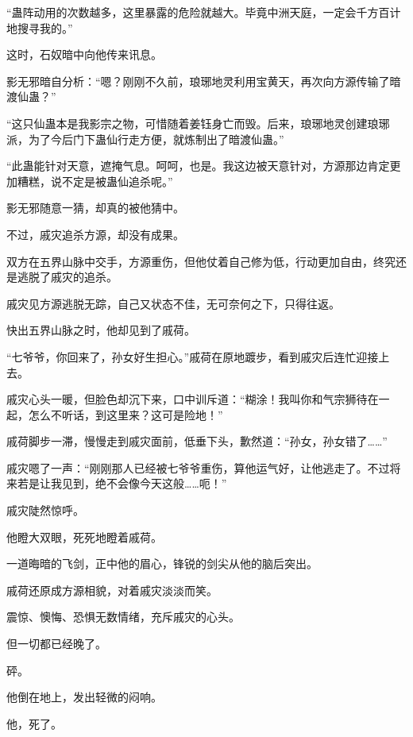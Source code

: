\begin{this_body}
“蛊阵动用的次数越多，这里暴露的危险就越大。毕竟中洲天庭，一定会千方百计地搜寻我的。”

这时，石奴暗中向他传来讯息。

影无邪暗自分析：“嗯？刚刚不久前，琅琊地灵利用宝黄天，再次向方源传输了暗渡仙蛊？”

“这只仙蛊本是我影宗之物，可惜随着姜钰身亡而毁。后来，琅琊地灵创建琅琊派，为了今后门下蛊仙行走方便，就炼制出了暗渡仙蛊。”

“此蛊能针对天意，遮掩气息。呵呵，也是。我这边被天意针对，方源那边肯定更加糟糕，说不定是被蛊仙追杀呢。”

影无邪随意一猜，却真的被他猜中。

不过，戚灾追杀方源，却没有成果。

双方在五界山脉中交手，方源重伤，但他仗着自己修为低，行动更加自由，终究还是逃脱了戚灾的追杀。

戚灾见方源逃脱无踪，自己又状态不佳，无可奈何之下，只得往返。

快出五界山脉之时，他却见到了戚荷。

“七爷爷，你回来了，孙女好生担心。”戚荷在原地踱步，看到戚灾后连忙迎接上去。

戚灾心头一暖，但脸色却沉下来，口中训斥道：“糊涂！我叫你和气宗狮待在一起，怎么不听话，到这里来？这可是险地！”

戚荷脚步一滞，慢慢走到戚灾面前，低垂下头，歉然道：“孙女，孙女错了……”

戚灾嗯了一声：“刚刚那人已经被七爷爷重伤，算他运气好，让他逃走了。不过将来若是让我见到，绝不会像今天这般……呃！”

戚灾陡然惊呼。

他瞪大双眼，死死地瞪着戚荷。

一道晦暗的飞剑，正中他的眉心，锋锐的剑尖从他的脑后突出。

戚荷还原成方源相貌，对着戚灾淡淡而笑。

震惊、懊悔、恐惧无数情绪，充斥戚灾的心头。

但一切都已经晚了。

砰。

他倒在地上，发出轻微的闷响。

他，死了。

\end{this_body}

